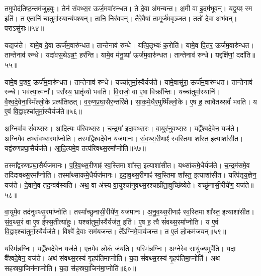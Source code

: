 तमुपोद॑तिष्ठ॒न्तम॑जुहवुः।
तेन॑ संवथ्स॒र ऊर्ज॒मवा॑रुन्धत।
ते दे॒वा अ॑मन्यन्त।
अ॒मी वा इ॒दम॑भूवन्।
यद्व॒यꣴ स्म इति॑।
त ए॒तानि॑ चातुर्मा॒स्यान्य॑पश्यन्।
तानि॒ निर॑वपन्।
तैरे॒वैषां तामूर्ज॑मवृञ्जत।
ततो॑ दे॒वा अभ॑वन्।
पराऽसु॑राः॥५४॥\ip

यद्यज॑ते।
यामे॒व दे॒वा ऊर्ज॑म॒वारु॑न्धत।
तान्तेनाव॑ रुन्धे।
यत्पि॒तृभ्यः॑ क॒रोति॑।
यामे॒व पि॒तर॒ ऊर्ज॑म॒वारु॑न्धत।
तान्तेनाव॑ रुन्धे।
यदा॑वस॒थे\-ऽन्न॒ꣳ॒ हर॑न्ति।
यामे॒व म॑नु॒ष्या॑ ऊर्ज॑म॒वारु॑न्धत।
तान्तेनाव॑ रुन्धे।
यद्दक्षि॑णां॒ ददा॑ति॥५५॥\ip

यामे॒व प॒शव॒ ऊर्ज॑म॒वारु॑न्धत।
तान्तेनाव॑ रुन्धे।
यच्चा॑तुर्मा॒स्यैर्\-यज॑ते।
यामे॒वासु॑रा॒ ऊर्ज॑म॒वारु॑न्धत।
तान्तेनाव॑ रुन्धे।
भव॑त्या॒त्मना᳚।
परा᳚स्य॒ भ्रातृ॑व्यो भवति।
वि॒राजो॒ वा ए॒षा विक्रा᳚न्तिः।
यच्चा॑तुर्मा॒स्यानि॑।
वै॒श्व॒दे॒वेना॒स्मिँल्लो॒के प्रत्य॑तिष्ठत्।
व॒रु॒ण॒प्र॒घा॒सैर॒न्तरि॑क्षे।
सा॒क॒मे॒धैर॒मुष्मिँ॑ल्लो॒के।
ए॒ष ह॒ त्वावैतथ्सर्वं॑ भवति।
य ए॒वं वि॒द्वाꣴश्चा॑तुर्मा॒स्यैर्यज॑ते॥५६॥\ip{}

अ॒ग्निर्वाव सं॑वथ्स॒रः।
आ॒दि॒त्यः प॑रिवथ्स॒रः।
च॒न्द्रमा॑ इदावथ्स॒रः।
वा॒युर॑नुवथ्स॒रः।
यद्वै᳚श्वदे॒वेन॒ यज॑ते।
अ॒ग्निमे॒व तथ्सं॑वथ्स॒रमा᳚प्नोति।
तस्मा᳚द्वैश्वदे॒वेन॒ यज॑मानः।
सं॒व॒थ्स॒रीणाꣴ॑ स्व॒स्तिमा शा᳚स्त॒ इत्याशा॑सीत।
यद्व॑रुण\-प्रघा॒सैर्यज॑ते।
आ॒दि॒त्यमे॒व तत्प॑रिवथ्स॒रमा᳚प्नोति॥५७॥\ip

तस्मा᳚द्वरुणप्रघा॒सैर्यज॑मानः।
प॒रि॒व॒थ्स॒रीणाꣴ॑ स्व॒स्तिमा शा᳚स्त॒ इत्याशा॑सीत।
यथ्सा॑कमे॒धैर्यज॑ते।
च॒न्द्रम॑समे॒व तदि॑दावथ्स॒र\-मा᳚प्नोति।
तस्मा᳚थ्साकमे॒धैर्यज॑मानः।
इ॒दा॒\-व॒थ्स॒रीणाꣴ॑ स्व॒स्तिमा शा᳚स्त॒ इत्याशा॑सीत।
यत्पि॑तृय॒ज्ञेन॒ यज॑ते।
दे॒वाने॒व तद॒न्वव॑स्यति।
अथ॒ वा अ॑स्य वा॒युश्चा॑नु\-वथ्स॒रश्चाप्री॑ता॒\-वुच्छि॑ष्येते।
यच्छु॑नासी॒रीये॑ण॒ यज॑ते॥५८॥\ip

वा॒युमे॒व तद॑नुवथ्स॒रमा᳚प्नोति।
तस्मा᳚च्छुनासी॒रीये॑ण॒ यज॑मानः।
अ॒नु॒व॒थ्स॒रीणाꣴ॑ स्व॒स्तिमा शा᳚स्त॒ इत्याशा॑सीत।
सं॒व॒थ्स॒रं वा ए॒ष ई᳚फ्स॒तीत्या॑हुः।
यश्चा॑तुर्मा॒स्यैर्यज॑त॒ इति॑।
ए॒ष ह॒ त्वै सं॑वथ्स॒रमा᳚प्नोति।
य ए॒वं वि॒द्वाꣴश्चा॑तुर्मा॒स्यैर्यज॑ते।
विश्वे॑ दे॒वाः सम॑यजन्त।
ते᳚ऽग्निमे॒वाय॑जन्त।
त ए॒तं लो॒कम॑जयन्॥५९॥\ip

यस्मि॑न्न॒ग्निः।
यद्वै᳚श्वदे॒वेन॒ यज॑ते।
ए॒तमे॒व लो॒कं ज॑यति।
यस्मि॑न्न॒ग्निः।
अ॒ग्नेरे॒व सायु॑ज्य॒मुपै॑ति।
य॒दा वै᳚श्वदे॒वेन॒ यज॑ते।
अथ॑ संवथ्स॒रस्य॑ गृ॒हप॑तिमाप्नोति।
य॒दा सं॑वथ्स॒रस्य॑ गृ॒हप॑तिमा॒प्नोति॑।
अथ॑ सहस्रया॒जिन॑माप्नोति।
य॒दा स॑हस्रया॒जिन॑मा॒प्नोति॑॥६०॥\ip

